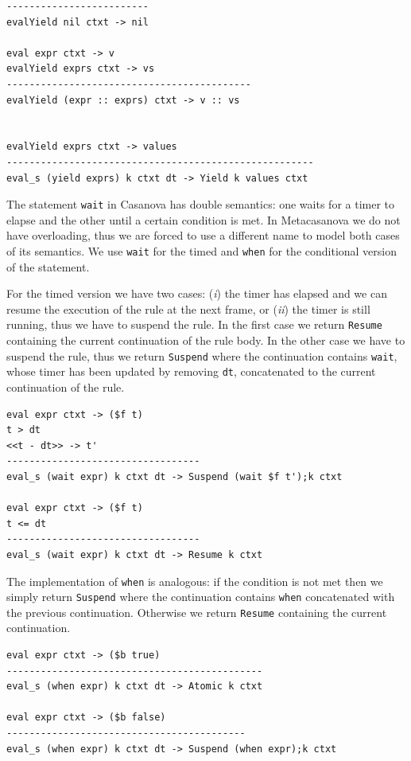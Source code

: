 \begin{lstlisting}
-------------------------
evalYield nil ctxt -> nil

eval expr ctxt -> v
evalYield exprs ctxt -> vs
-------------------------------------------
evalYield (expr :: exprs) ctxt -> v :: vs


evalYield exprs ctxt -> values
------------------------------------------------------
eval_s (yield exprs) k ctxt dt -> Yield k values ctxt
\end{lstlisting}

\noindent
The statement \texttt{wait} in Casanova has double semantics: one waits for a timer to elapse and the other until a certain condition is met. In Metacasanova we do not have overloading, thus we are forced to use a different name to model both cases of its semantics. We use \texttt{wait} for the timed and \texttt{when} for the conditional version of the statement.

For the timed version we have two cases: (\textit{i}) the timer has elapsed and we can resume the execution of the rule at the next frame, or (\textit{ii}) the timer is still running, thus we have to suspend the rule. In the first case we return \texttt{Resume} containing the current continuation of the rule body. In the other case we have to suspend the rule, thus we return \texttt{Suspend} where the continuation contains \texttt{wait}, whose timer has been updated by removing \texttt{dt}, concatenated to the current continuation of the rule.

\begin{lstlisting}
eval expr ctxt -> ($f t)
t > dt
<<t - dt>> -> t'
----------------------------------
eval_s (wait expr) k ctxt dt -> Suspend (wait $f t');k ctxt

eval expr ctxt -> ($f t)
t <= dt
----------------------------------
eval_s (wait expr) k ctxt dt -> Resume k ctxt
\end{lstlisting}

\noindent
The implementation of \texttt{when} is analogous: if the condition is not met then we simply return \texttt{Suspend} where the continuation contains \texttt{when} concatenated with the previous continuation. Otherwise we return \texttt{Resume} containing the current continuation.

\begin{lstlisting}
eval expr ctxt -> ($b true)
---------------------------------------------
eval_s (when expr) k ctxt dt -> Atomic k ctxt

eval expr ctxt -> ($b false)
------------------------------------------
eval_s (when expr) k ctxt dt -> Suspend (when expr);k ctxt
\end{lstlisting}

